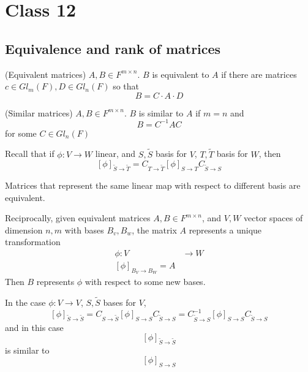\section{Class 12}

\subsection{Equivalence and rank of matrices}

\begin{definition}
    (Equivalent matrices) $A, B \in F^{m \times n}$. $B$ is equivalent to $A$ if there are matrices $c \in Gl_m(F), D \in Gl_n(F)$ so that 
    \[
        B = C \cdot A \cdot D
    \]
\end{definition}

\begin{definition}
    (Similar matrices) $A, B \in F^{m \times n}$. $B$ is similar to $A$ if $m = n$ and 
    \[
        B = C^{-1} A C
    \]
    for some $C \in Gl_n(F)$
\end{definition}

\begin{remark}
    Recall that if $\phi: V \to W$ linear, and $S, \tilde{S}$ basis for $V$, $T, \tilde{T}$ basis for $W$, then 
    \[
        \left[ \phi \right]_{\tilde{S} \to \tilde{T}} = C_{T \to \tilde{T}} \left[ \phi \right]_{S \to T} C_{\tilde{S} \to S}
    \]

    Matrices that represent the same linear map with respect to different basis are equivalent.  \\
\end{remark}

\begin{remark}
    Reciprocally, given equivalent matrices $A, B \in F^{m \times n}$, and $V, W$ vector spaces of dimension $n, m$ with bases $B_v, B_w$, the matrix $A$ represents a unique transformation 
    \begin{align*}
        \phi: V & \to W \\
        \left[ \phi \right]_{B_V \to B_W} = A
    \end{align*}
    Then $B$ represents $\phi$ with respect to some new bases.
\end{remark}

\begin{remark}
    In the case $ \phi: V \to V$, $S, \tilde{S}$ bases for $V$, 
    \[
        \left[ \phi \right]_{\tilde{S} \to \tilde{S}} 
        = C_{S \to \tilde{S}} \left[ \phi \right]_{S \to S} C_{\tilde{S} \to S} 
        = C_{\tilde{S} \to S}^{-1} \left[ \phi \right]_{S \to S} C_{\tilde{S} \to S}
    \]
    and in this case 
    \[
        \left[ \phi \right]_{\tilde{S} \to \tilde{S}}
    \]
    is similar to
    \[
        \left[ \phi \right]_{{S} \to {S}}
    \]
\end{remark}

